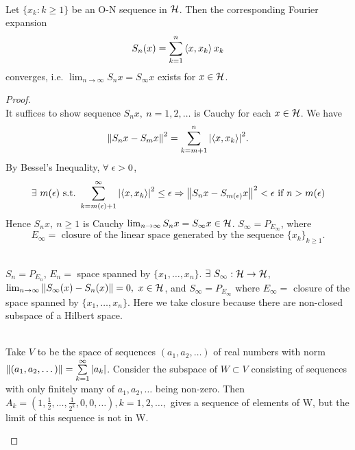 \vspace{3pt}
\begin{theorem}\ \\
Let $\{x_k: k \geq 1\}$ be an O-N sequence in $\mathcal{H}$. Then the corresponding Fourier expansion 
\begin{equation*}
S_n(x) = \sum_{k = 1}^n \left\langle x, x_k \right\rangle x_k    
\end{equation*} 
converges, i.e. $\lim_{n \to \infty} S_n x = S_\infty x$ exists for $x \in \mathcal{H}$. 
\end{theorem}
\begin{proof}\ \\
It suffices to show sequence $S_n x,\ n = 1,2,\dots$ is Cauchy for each $x \in \mathcal{H}$. We have 
$$\norm{S_n x - S_m x}^2 = \sum_{k = m+1}^n \abs{\left\langle x, x_k \right\rangle}^2.$$ 
By Bessel's Inequality, $\forall\ \epsilon > 0$, 
\begin{equation*}
    \exists\ m(\epsilon) \ \mathrm{s.t.}\  \sum_{k = m(\epsilon) + 1}^\infty \abs{\left\langle x, x_k \right\rangle}^2 \leq \epsilon \Rightarrow \norm{S_n x - S_{m(\epsilon)} x}^2 < \epsilon \text{ if } n > m(\epsilon)
\end{equation*} 
Hence $S_n x,\ n \geq 1$ is Cauchy \imply $\lim_{n \to \infty} S_n x = S_\infty x \in \mathcal{H}$. $S_\infty = P_{E_\infty}$, where $$E_\infty = \text{ closure of the linear space generated by the sequence } \{x_k\}_{k \geq 1}.$$
\begin{remark}\ \\
    $S_n = P_{E_n}$, $E_n = $ space spanned by $\{x_1,\dots,x_n\}$. $\exists\ S_\infty: \mathcal{H} \to \mathcal{H}$, $\lim_{n \to \infty} \norm{S_\infty (x) - S_n(x)} = 0,\ x \in \mathcal{H}$, and $S_\infty = P_{E_\infty}$ where $E_\infty = $ closure of the space spanned by $\{x_1,\dots,x_n\}$. Here we take closure because there are non-closed subspace of a Hilbert space.
\end{remark}
\begin{example}\ \\
Take $V$ to be the space of sequences $(a_1,a_2,\dots)$ of real numbers with norm $\norm{(a_1,a_2,\dots)} = \sum\limits_{k=1}^{\infty} \abs{a_k}$. Consider the subspace of $W \subset V $ consisting of sequences with only finitely many of $a_1,a_2,\dots$ being non-zero. Then $A_k=(1,\frac{1}{2},\dots,\frac{1}{2^k},0,0,\dots), k=1,2,\dots,$ gives a sequence of elements of W, but the limit of this sequence is not in W.
\end{example}
\end{proof}


